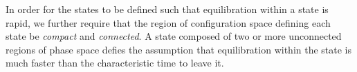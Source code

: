 In order for the states to be defined such that equilibration within a state is rapid, we further require that the region of configuration space defining each state be \emph{compact} and \emph{connected}.
A state composed of two or more unconnected regions of phase space defies the assumption that equilibration within the state is much faster than the characteristic time to leave it.





